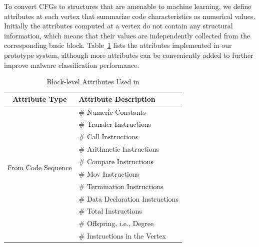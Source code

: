 



To convert CFGs to structures that are amenable to machine learning, we define attributes at each vertex that summarize code characteristics as numerical values.
Initially the attributes computed at a vertex do not contain any structural information, which means that their values are independently collected from the corresponding basic block.
Table~\ref{MG:Tab:UsedAttributes} lists the attributes implemented in our prototype system, although more attributes can be conveniently added to further improve malware classification performance.

\begin{table}[htbp]
    \caption{Block-level Attributes Used in \sysname}
    \begin{center}
        \begin{tabular}{c|l}
            \hline
            Attribute Type & Attribute Description \\
            \hline
            \multirow{10}{*}{From Code Sequence} & \# Numeric Constants \\
            & \# Transfer Instructions         \\
            & \# Call Instructions             \\
            & \# Arithmetic Instructions       \\
            & \# Compare Instructions          \\
            & \# Mov Instructions              \\
            & \# Termination Instructions      \\
            & \# Data Declaration Instructions \\
            & \# Total Instructions            \\
            \hline
            \multirow{2}{*}{From Vertex Structure} & \# Offspring, i.e., Degree \\
            & \# Instructions in the Vertex    \\
            \hline
        \end{tabular}
        \label{MG:Tab:UsedAttributes}
    \end{center}
\end{table}

